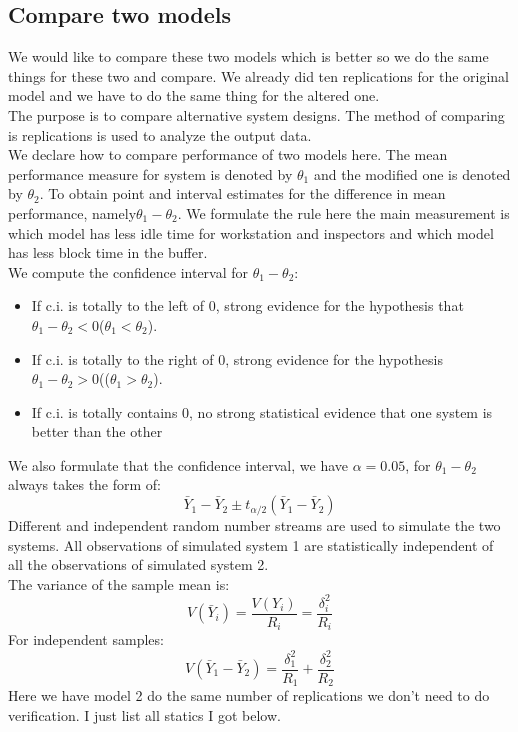 \documentclass{article}
\begin{document}
\subsection{Compare two models}
We would like to compare these two models which is better so we do the same things for these two and compare. We already did ten replications for the original model and we have to do the same thing for the altered one. \\
The purpose is to compare alternative system designs. The method of comparing is replications is used to analyze the output data.\\
We declare how to compare performance of two models here. The mean performance measure for system is denoted by $\theta_1$ and the modified one is denoted by $\theta_2$. To obtain point and interval estimates for the difference in mean performance, namely$\theta_1-\theta_2$. We formulate the rule here the main measurement is which model has less idle time for workstation and inspectors and which model has less block time in the buffer.\\
We compute the confidence interval for $\theta_1 - \theta_2$:

\begin{itemize}
\item If c.i. is totally to the left of 0, strong evidence for the hypothesis that $\theta_1-\theta_2 < 0$($\theta_1<\theta_2$).
\item If c.i. is totally to the right of 0, strong evidence for the hypothesis $\theta_1-\theta_2 > 0$(($\theta_1>\theta_2$).
\item If c.i. is totally contains 0, no strong statistical evidence that one system is better than the other
\end{itemize}

We also formulate that the confidence interval, we have $\alpha = 0.05$, for $\theta_1-\theta_2$always takes the form of:
\begin{equation}
\bar Y_1-\bar Y_2\pm t_{\alpha/2}(\bar Y_1-\bar Y_2)
\end{equation}
Different and independent random number streams are used to simulate the two systems. All observations of simulated system 1 are statistically independent of all the observations of simulated system 2.\\
The variance of the sample mean is:
\begin{equation}
V(\bar Y_i) = \frac{V(Y_i)}{R_i}=\frac {\delta _i ^2}{R_i}
\end{equation}
For independent samples:
\begin{equation}
V(\bar Y_1-\bar Y_2) = \frac {\delta _1 ^2}{R_1}+\frac {\delta _2 ^2}{R_2}
\end{equation}
Here we have model 2 do the same number of replications we don't need to do verification. I just list all statics I got below.
\end{document}
